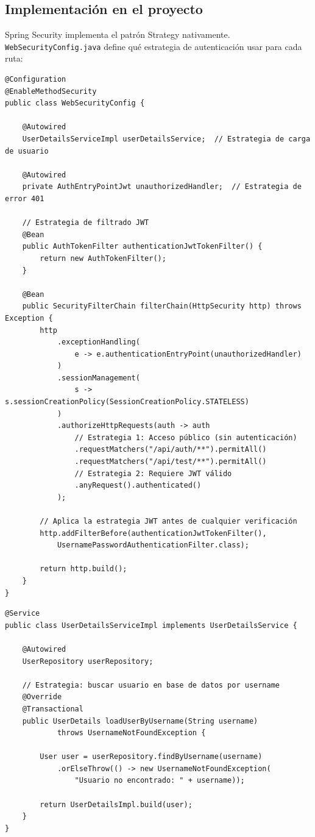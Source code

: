 \documentclass[12pt,a4paper]{article}
\begin{document}
\subsection{Implementaci\'on en el proyecto}

Spring Security implementa el patr\'on Strategy nativamente. \texttt{WebSecurityConfig.java} define qu\'e estrategia de autenticaci\'on usar para cada ruta:

\begin{lstlisting}[caption={WebSecurityConfig.java -- Definici\'on de estrategias de seguridad}]
@Configuration
@EnableMethodSecurity
public class WebSecurityConfig {

    @Autowired
    UserDetailsServiceImpl userDetailsService;  // Estrategia de carga de usuario

    @Autowired
    private AuthEntryPointJwt unauthorizedHandler;  // Estrategia de error 401

    // Estrategia de filtrado JWT
    @Bean
    public AuthTokenFilter authenticationJwtTokenFilter() {
        return new AuthTokenFilter();
    }

    @Bean
    public SecurityFilterChain filterChain(HttpSecurity http) throws Exception {
        http
            .exceptionHandling(
                e -> e.authenticationEntryPoint(unauthorizedHandler)
            )
            .sessionManagement(
                s -> s.sessionCreationPolicy(SessionCreationPolicy.STATELESS)
            )
            .authorizeHttpRequests(auth -> auth
                // Estrategia 1: Acceso público (sin autenticación)
                .requestMatchers("/api/auth/**").permitAll()
                .requestMatchers("/api/test/**").permitAll()
                // Estrategia 2: Requiere JWT válido
                .anyRequest().authenticated()
            );

        // Aplica la estrategia JWT antes de cualquier verificación
        http.addFilterBefore(authenticationJwtTokenFilter(),
            UsernamePasswordAuthenticationFilter.class);

        return http.build();
    }
}
\end{lstlisting}

\begin{lstlisting}[caption={UserDetailsServiceImpl.java -- Estrategia de carga de usuarios}]
@Service
public class UserDetailsServiceImpl implements UserDetailsService {

    @Autowired
    UserRepository userRepository;

    // Estrategia: buscar usuario en base de datos por username
    @Override
    @Transactional
    public UserDetails loadUserByUsername(String username)
            throws UsernameNotFoundException {

        User user = userRepository.findByUsername(username)
            .orElseThrow(() -> new UsernameNotFoundException(
                "Usuario no encontrado: " + username));

        return UserDetailsImpl.build(user);
    }
}
\end{lstlisting}
\end{document}
